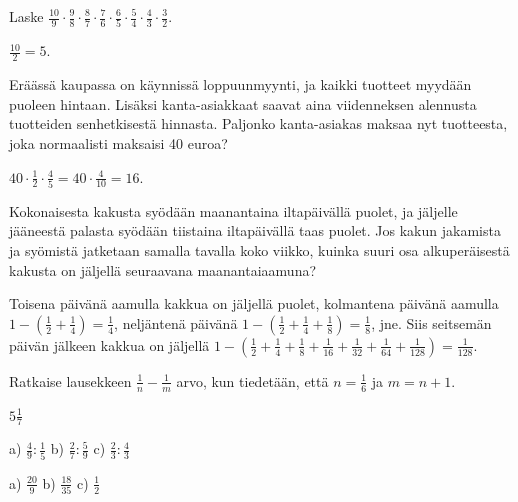 \begin{tehtavasivu}
    \begin{tehtava}
        Laske 
        $\frac{10}{9}\cdot \frac{9}{8}\cdot \frac{8}{7}\cdot \frac{7}{6}\cdot \frac{6}{5}
            \cdot \frac{5}{4}\cdot \frac{4}{3}\cdot \frac{3}{2}$.
        
        \begin{vastaus}
            $\frac{10}{2}=5$.
        \end{vastaus}        
    \end{tehtava}
    
    \begin{tehtava}
    	Eräässä kaupassa on käynnissä loppuunmyynti, ja kaikki tuotteet
        myydään puoleen hintaan. Lisäksi kanta-asiakkaat saavat aina
        viidenneksen alennusta tuotteiden senhetkisestä hinnasta.
    	Paljonko kanta-asiakas maksaa nyt tuotteesta, joka normaalisti
        maksaisi 40 euroa?
    	\begin{vastaus}
    	$40\cdot \frac{1}{2} \cdot \frac{4}{5}=40\cdot \frac{4}{10}= 16$. 
    	\end{vastaus}
    \end{tehtava}
    
    \begin{tehtava}
        Kokonaisesta kakusta syödään maanantaina iltapäivällä puolet, ja jäljelle
        jääneestä palasta syödään tiistaina iltapäivällä taas puolet.
        Jos kakun jakamista ja syömistä jatketaan samalla tavalla koko viikko,
        kuinka suuri osa alkuperäisestä kakusta on
        jäljellä seuraavana maanantaiaamuna?
        
        \begin{vastaus}
            Toisena päivänä aamulla kakkua on jäljellä puolet, kolmantena
            päivänä aamulla
                $1-\left(\frac{1}{2} + \frac{1}{4}\right) = \frac{1}{4}$, 
            neljäntenä päivänä
                $1-\left(\frac{1}{2} + \frac{1}{4} + \frac{1}{8}\right)
                = \frac{1}{8}$, jne.
            Siis seitsemän päivän jälkeen kakkua on jäljellä
                $1-\left(\frac{1}{2} + \frac{1}{4} + \frac{1}{8} +
                \frac{1}{16} + \frac{1}{32} + \frac{1}{64} + \frac{1}{128}\right)
                = \frac{1}{128}$.  
        \end{vastaus}
    \end{tehtava}

    \begin{tehtava} %
Ratkaise lausekkeen $\frac{1}{n}-\frac{1}{m}$ arvo, kun tiedetään, että $n = \frac{1}{6}$ ja $m=n+1$.
        \begin{vastaus}
            $5 \frac{1}{7}$
        \end{vastaus}
    \end{tehtava}


\begin{tehtava}
a) $\frac{4}{9} : \frac{1}{5}$ \qquad b) $\frac{2}{7}:\frac{5}{9}$ \qquad c) $\frac{2}{3}:\frac{4}{3}$
\begin{vastaus}
a) $\frac{20}{9}$ \qquad b) $\frac{18}{35}$ \qquad c) $\frac{1}{2}$
\end{vastaus}
\end{tehtava}

\end{tehtavasivu}